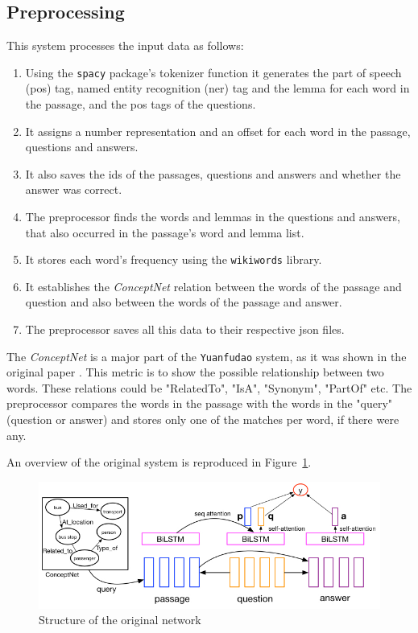 
\subsection{Preprocessing}
This system processes the input data as follows:

\begin{enumerate}
	\item Using the \texttt{spacy} package's tokenizer function it generates the part of speech (pos) tag, named entity recognition (ner) tag and the lemma for each word in the passage, and the pos tags of the questions.
	\item It assigns a number representation and an offset for each word in the passage, questions and answers.
	\item It also saves the ids of the passages, questions and answers and whether the answer was correct.
	\item The preprocessor finds the words and lemmas in the questions and answers, that also occurred in the passage's word and lemma list. 
	\item It stores each word's frequency using the \texttt{wikiwords} library.
	\item It  establishes the \textit{ConceptNet} relation between the words of the passage and question and also between the words of the passage and answer.
	\item The preprocessor saves all this data to their respective json files.
\end{enumerate}


The \textit{ConceptNet} is a major part of the \texttt{Yuanfudao} system, as it was shown in the original paper \cite{Wang:2018}. This metric is to show the possible relationship between two words. These relations could be "RelatedTo", "IsA", "Synonym", "PartOf" etc. The preprocessor compares the words in the passage with the words in the "query" (question or answer) and stores only one of the matches per word, if there were any.

An overview of the original system is reproduced in Figure~\ref{fig:dnn}.
\begin{figure}[h!]
	\centering
	\includegraphics[scale=0.5]{TriAN.jpg}
	\caption{Structure of the original network \cite{Wang:2018}}
	\label{fig:dnn}
\end{figure}

